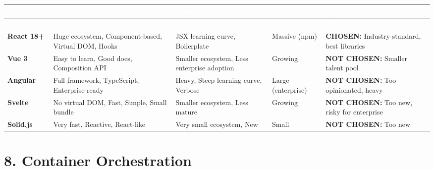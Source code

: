 \documentclass[12pt,a4paper,landscape]{article}
\begin{document}
\begin{longtable}{|p{2.5cm}|p{3cm}|p{3cm}|p{3cm}|p{4cm}|}
\hline
\rowcolor{headercolor}
\textcolor{white}{\textbf{Framework}} & 
\textcolor{white}{\textbf{Pros}} & 
\textcolor{white}{\textbf{Cons}} & 
\textcolor{white}{\textbf{Ecosystem}} & 
\textcolor{white}{\textbf{Why Chosen/Not}} \\
\hline
\endfirsthead

\hline
\rowcolor{headercolor}
\textcolor{white}{\textbf{Framework}} & 
\textcolor{white}{\textbf{Pros}} & 
\textcolor{white}{\textbf{Cons}} & 
\textcolor{white}{\textbf{Ecosystem}} & 
\textcolor{white}{\textbf{Why Chosen/Not}} \\
\hline
\endhead

\rowcolor{rowcolor1}
\textbf{React 18+} & 
Huge ecosystem, Component-based, Virtual DOM, Hooks & 
JSX learning curve, Boilerplate & 
Massive (npm) & 
\textbf{CHOSEN:} Industry standard, best libraries \\
\hline

\rowcolor{rowcolor2}
\textbf{Vue 3} & 
Easy to learn, Good docs, Composition API & 
Smaller ecosystem, Less enterprise adoption & 
Growing & 
\textbf{NOT CHOSEN:} Smaller talent pool \\
\hline

\rowcolor{rowcolor1}
\textbf{Angular} & 
Full framework, TypeScript, Enterprise-ready & 
Heavy, Steep learning curve, Verbose & 
Large (enterprise) & 
\textbf{NOT CHOSEN:} Too opinionated, heavy \\
\hline

\rowcolor{rowcolor2}
\textbf{Svelte} & 
No virtual DOM, Fast, Simple, Small bundle & 
Smaller ecosystem, Less mature & 
Growing & 
\textbf{NOT CHOSEN:} Too new, risky for enterprise \\
\hline

\rowcolor{rowcolor1}
\textbf{Solid.js} & 
Very fast, Reactive, React-like & 
Very small ecosystem, New & 
Small & 
\textbf{NOT CHOSEN:} Too new \\
\hline
\end{longtable}

\section*{8. Container Orchestration}
\end{document}
